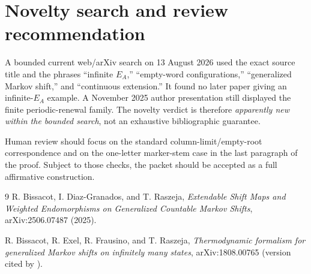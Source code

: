 \documentclass[11pt]{article}
\newcommand{\EA}{E_A}
\begin{document}
\section{Novelty search and review recommendation}

A bounded current web/arXiv search on 13 August 2026 used the exact source
title and the phrases ``infinite $E_A$,'' ``empty-word configurations,''
``generalized Markov shift,'' and ``continuous extension.''  It found no
later paper giving an infinite-$\EA$ example.  A
November 2025 author presentation still displayed the finite periodic-renewal
family.  The novelty verdict is therefore \emph{apparently new within the
bounded search}, not an exhaustive bibliographic guarantee.

Human review should focus on the standard column-limit/empty-root
correspondence and on the one-letter marker-stem case in the last paragraph of
the proof.  Subject to those checks, the packet should be accepted as a full
affirmative construction.

\begin{thebibliography}{9}
R. Bissacot, I. Diaz-Granados, and T. Raszeja,
\emph{Extendable Shift Maps and Weighted Endomorphisms on Generalized
Countable Markov Shifts}, arXiv:2506.07487 (2025).

R. Bissacot, R. Exel, R. Frausino, and T. Raszeja,
\emph{Thermodynamic formalism for generalized Markov shifts on infinitely
many states}, arXiv:1808.00765 (version cited by \cite{source}).
\end{thebibliography}
\end{document}
